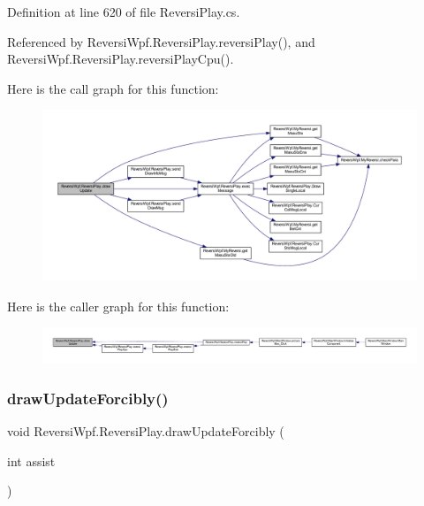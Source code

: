 Definition at line 620 of file Reversi\+Play.\+cs.



Referenced by Reversi\+Wpf.\+Reversi\+Play.\+reversi\+Play(), and Reversi\+Wpf.\+Reversi\+Play.\+reversi\+Play\+Cpu().

Here is the call graph for this function\+:
\nopagebreak
\begin{figure}[H]
\begin{center}
\leavevmode
\includegraphics[width=350pt]{class_reversi_wpf_1_1_reversi_play_ae64bc4578a896ccd8fcff7b35763cf2e_cgraph}
\end{center}
\end{figure}
Here is the caller graph for this function\+:
\nopagebreak
\begin{figure}[H]
\begin{center}
\leavevmode
\includegraphics[width=350pt]{class_reversi_wpf_1_1_reversi_play_ae64bc4578a896ccd8fcff7b35763cf2e_icgraph}
\end{center}
\end{figure}
\mbox{\label{class_reversi_wpf_1_1_reversi_play_a0324e804add5c651915266f0254eb26f}} 
\subsubsection{\texorpdfstring{draw\+Update\+Forcibly()}{drawUpdateForcibly()}}
{\footnotesize\ttfamily void Reversi\+Wpf.\+Reversi\+Play.\+draw\+Update\+Forcibly (\begin{DoxyParamCaption}\item[{int}]{assist }\end{DoxyParamCaption})}



